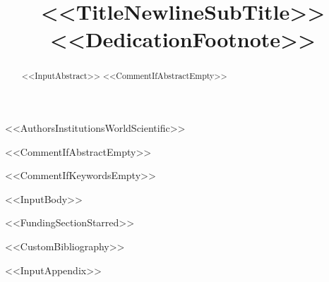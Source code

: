 \documentclass[<<DocumentClassOptions>>]{ws-ppl}
\begin{document}
\catchline{}{}{}{}{}

\title{<<TitleNewlineSubTitle>><<DedicationFootnote>>}

<<AuthorsInstitutionsWorldScientific>>

\maketitle

\begin{history}
\end{history}

<<CommentIfAbstractEmpty>>\begin{abstract}
<<InputAbstract>>
<<CommentIfAbstractEmpty>>\end{abstract}

<<CommentIfKeywordsEmpty>>

<<InputBody>>

<<FundingSectionStarred>>


<<CustomBibliography>>

\let\section\appendix
\let\subsection\subappendix
\let\subsubsection\subsubappendix
<<InputAppendix>>
\end{document}
